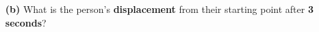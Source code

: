 \documentclass[A4,12pt]{article}
\begin{document}
\begin{enumerate}[label=\bfseries (\arabic*)]
\begin{itemize}
    \item[\bf (b)] What is the person’s \textbf{displacement} from their starting point after \textbf{3 seconds}?

\end{itemize}
\end{enumerate}
\end{document}
